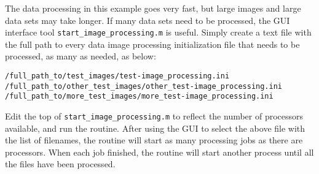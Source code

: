 The data processing in this example goes very fast, but large images and large data sets may take longer.  If many data sets need to be processed, the GUI interface tool \texttt{start\allowbreak\_image\allowbreak\_processing.m} is useful.  Simply create a text file with the full path to every data image processing initialization file that needs to be processed, as many as needed, as below:

\begin{verbatim}
/full_path_to/test_images/test-image_processing.ini
/full_path_to/other_test_images/other_test-image_processing.ini
/full_path_to/more_test_images/more_test-image_processing.ini
\end{verbatim}

Edit the top of \texttt{start\allowbreak\_image\allowbreak\_processing.m} to reflect the number of processors available, and run the routine.  After using the GUI to select the above file with the list of filenames, the routine will start as many processing jobs as there are processors.  When each job finished, the routine will start another process until all the files have been processed.
 
